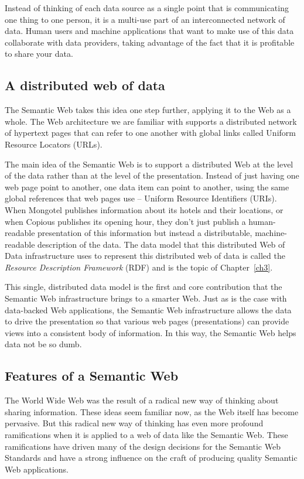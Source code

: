 Instead of thinking of each data source as a single point that is communicating one thing 
to one person, it is a multi-use part of an interconnected network of data.   Human users and 
machine applications that want to make use of this data collaborate with data providers, taking 
advantage of the fact that it is profitable to share your data.

\subsection{A distributed web of data}




The Semantic Web takes this idea one step further, applying it to the
Web as a whole. The Web architecture we are familiar with supports a distributed
network of hypertext pages that can refer to one another with global links
called Uniform Resource Locators (URLs). 

The main idea of the Semantic Web is to support a distributed Web at the
level of the data rather than at the level of the presentation. Instead
of just having one web page point to another, one data item can point to
another, using the same global references that web pages use -- Uniform
Resource Identifiers (URIs).   When Mongotel publishes information about its hotels and
their locations, or when Copious publishes its opening hour, they don't
just publish a human-readable presentation
of this information but instead a distributable, machine-readable
description of the data. The data model that this distributed Web of
Data infrastructure uses to represent this distributed web of data is
called the \emph{Resource Description Framework} (RDF) and is the topic of
Chapter~\ref{ch3}.  

This single, distributed data model is the first and core contribution
that the Semantic Web infrastructure brings to a smarter Web. Just as is
the case with data-backed Web applications, the Semantic Web
infrastructure allows the data to drive the presentation so that various
web pages (presentations) can provide views into a consistent body of
information. In this way, the Semantic Web helps data not be so dumb.

\subsection{Features of a Semantic Web}

The World Wide Web was the result of a radical new way of thinking about
sharing information. These ideas seem familiar now, as the Web itself
has become pervasive. But this radical new way of thinking has even more
profound ramifications when it is applied to a web of data like the
Semantic Web. These ramifications have driven many of the design
decisions for the Semantic Web Standards and have a strong influence on
the craft of producing quality Semantic Web applications.

